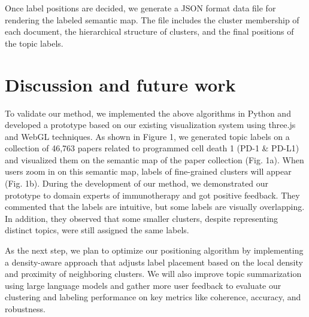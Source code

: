\documentclass{vgtc}                          %
\begin{document}
Once label positions are decided, we generate a JSON format data file for rendering the labeled semantic map. The file includes the cluster membership of each document, the hierarchical structure of clusters, and the final positions of the topic labels. 


\section{Discussion and future work}

To validate our method, we implemented the above algorithms in Python and developed a prototype based on our existing visualization system using three.js and WebGL techniques. As shown in Figure 1, we generated topic labels on a collection of 46,763 papers related to programmed cell death 1 (PD-1 \& PD-L1) and visualized them on the semantic map of the paper collection (Fig. 1a). When users zoom in on this semantic map, labels of fine-grained clusters will appear (Fig. 1b). During the development of our method, we demonstrated our prototype to domain experts of immunotherapy and got positive feedback. They commented that the labels are intuitive, but some labels are visually overlapping. In addition, they observed that some smaller clusters, despite representing distinct topics, were still assigned the same labels.


As the next step, we plan to optimize our positioning algorithm by implementing a density-aware approach that adjusts label placement based on the local density and proximity of neighboring clusters. We will also improve topic summarization using large language models and gather more user feedback to evaluate our clustering and labeling performance on key metrics like coherence, accuracy, and robustness.






%

%
%
%


\end{document}
